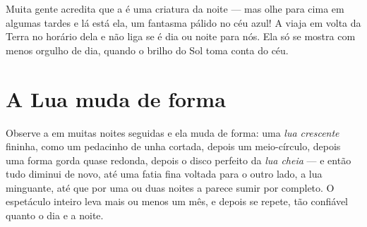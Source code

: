 \begin{remark}\label{rem:g2:moon-in-the-sky:daytime}
Muita gente acredita que a  é uma criatura da noite --- mas olhe
para cima em algumas tardes e lá está ela, um fantasma pálido no céu
azul! A  viaja em volta da Terra no horário dela e não liga se é
dia ou noite para nós. Ela só se mostra com menos orgulho de dia,
quando o brilho do Sol toma conta do céu.
\end{remark}

\section{A Lua muda de forma}

\begin{example}\label{ex:g2:moon-in-the-sky:shapes}
Observe a  em muitas noites seguidas e ela muda de forma: uma
\emph{lua crescente} fininha, como um pedacinho
de unha cortada, depois um meio-círculo, depois uma forma gorda quase
redonda, depois o disco perfeito da \emph{lua cheia} --- e então tudo diminui de novo, até uma fatia fina voltada
para o outro lado, a lua minguante, até que por uma ou duas noites a
 parece sumir por completo. O espetáculo inteiro leva mais ou
menos um mês, e depois se repete, tão confiável quanto o dia e a
noite.
\end{example}

